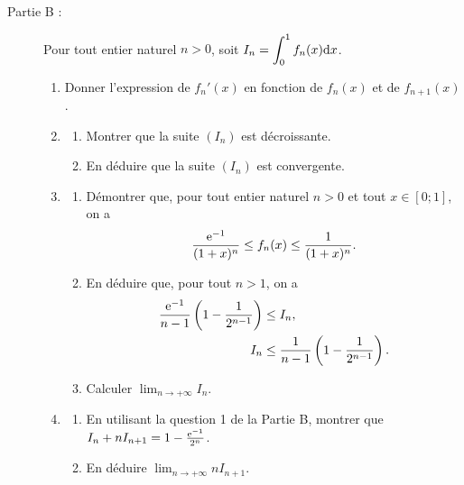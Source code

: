 \begin{exo}
\begin{description}
      \item[Partie B :]
            Pour tout entier naturel $n > 0$, soit $\displaystyle{I_n = \int_{0}^{1} f_n (x) \mathrm{d}x}$.
            \begin{enumerate}
                  \item Donner l'expression de $f_n'(x)$ en fonction de $f_n (x)$ et de $f_{n+1} (x)$.
                  \item \begin{enumerate}
                              \item Montrer que la suite $(I_n)$ est d\'ecroissante.
                              \item En d\'eduire que la suite $(I_n)$ est convergente.
                        \end{enumerate}
                  \item \begin{enumerate}
                              \item D\'emontrer que, pour tout entier naturel $n > 0$ et tout $x \in [0 ; 1]$, on a
                                    \[
                                      \frac{\mathrm{e}^{-1}}{(1+x)^n}
                                      \leq f_n(x)
                                      \leq \frac{1}{(1+x)^n}.
                                    \]
                              \item En d\'eduire que, pour tout $n > 1$, on a
                                    \[
                                      \begin{aligned}
                                        \frac{\mathrm{e}^{-1}}{n-1}
                                        \left(1-\frac{1}{2^{n-1}}\right)
                                        &\leq I_n, \\
                                        I_n
                                        &\leq \frac{1}{n-1}
                                        \left(1-\frac{1}{2^{n-1}}\right).
                                      \end{aligned}
                                    \]
                              \item Calculer $\displaystyle{\lim_{n\rightarrow+\infty} I_n}$.
                        \end{enumerate}
                  \item \begin{enumerate}
                              \item En utilisant la question 1 de la Partie B, montrer que 
                                    $I_n + n I_{n+1} = 1 - \frac{\mathrm{e}^{-1}}{2^n}$.
                              \item En d\'eduire $\displaystyle{\lim_{n\rightarrow+\infty} n I_{n+1}}$.
                        \end{enumerate}
            \end{enumerate}
      \end{description}
\end{exo}
